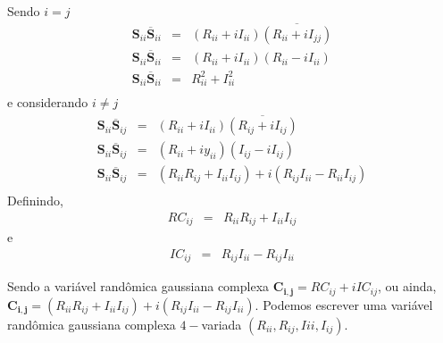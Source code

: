 Sendo $i=j$
\begin{equation}
\begin{array}{ccc}
\mathbf{S}_{ii}\overline{\mathbf{S}}_{ii}&=& (R_{ii}+iI_{ii})\overline{(R_{ii}+iI_{jj})} \\
\mathbf{S}_{ii}\overline{\mathbf{S}}_{ii}&=& (R_{ii}+iI_{ii})(R_{ii}-iI_{ii}) \\
\mathbf{S}_{ii}\overline{\mathbf{S}}_{ii}&=& R_{ii}^2+I_{ii}^2 \\
\end{array}
\end{equation}
e considerando $i \neq j$
\begin{equation}
\begin{array}{ccc}
\mathbf{S}_{ii}\overline{\mathbf{S}}_{ij}&=& (R_{ii}+iI_{ii})\overline{(R_{ij}+iI_{ij})} \\
\mathbf{S}_{ii}\overline{\mathbf{S}}_{ij}&=& (R_{ii}+iy_{ii})(I_{ij}-iI_{ij}) \\
\mathbf{S}_{ii}\overline{\mathbf{S}}_{ij}&=& (R_{ii}R_{ij}+I_{ii}I_{ij})+i(R_{ij}I_{ii}-R_{ii}I_{ij}) \\
\end{array}
\end{equation}
 Definindo,
 \begin{equation}
\begin{array}{ccc}
	  RC_{ij}&=&  R_{ii}R_{ij}+I_{ii}I_{ij} 
\end{array}
\end{equation}
e
\begin{equation}
\begin{array}{ccc}
	  IC_{ij}&=& R_{ij}I_{ii}-R_{ij}I_{ii}
\end{array}
\end{equation}

Sendo a variável randômica gaussiana complexa $\mathbf{C_{i,j}}=RC_{ij} + i IC_{ij}$, ou ainda, $\mathbf{C_{i,j}}=(R_{ii}R_{ij}+I_{ii}I_{ij}) + i(R_{ij}I_{ii}-R_{ij}I_{ii})$. Podemos escrever uma variável randômica gaussiana complexa $4-$variada $(R_{ii},R_{ij},I{ii},I_{ij})$.

